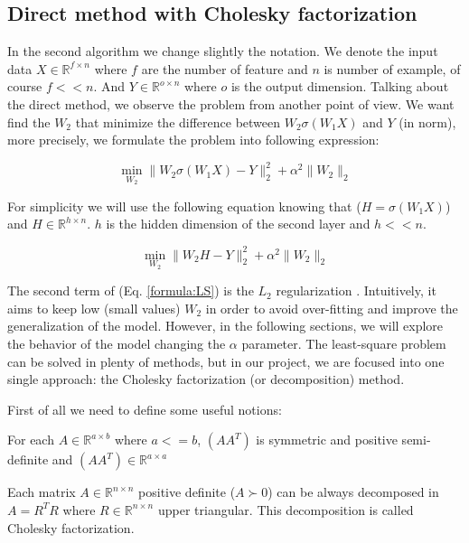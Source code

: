\subsection{Direct method with Cholesky factorization}
In the second algorithm we change slightly the notation. We denote the input data $X \in \mathbb{R}^{f \times n}$ where $f$ are the number of feature and $n$ is number of example, of course $f << n$. And $Y \in \mathbb{R}^{o \times n}$ where $o$ is the output dimension. Talking about the direct method, we observe the problem from another point of view. We want find the $W_2$ that minimize the difference between $W_2\sigma(W_1X)$ and $Y$ (in norm), more precisely, we formulate the problem into following expression:

\begin{equation}
\label{formula:LS}
\min_{W_2} \|W_2\sigma(W_1X) - Y\|_2^2  + \alpha^2\|W_2\|_2
\end{equation}

For simplicity we will use the following equation knowing that ($H = \sigma(W_1X)$) and $H \in \mathbb{R}^{h \times n}$. $h$ is the hidden dimension of the second layer and $h << n$.

\begin{equation}
\label{formula:LS}
\min_{W_2} \|W_2H- Y\|_2^2  + \alpha^2\|W_2\|_2
\end{equation}


The second term of (Eq. \ref{formula:LS}) is the $L_2$ regularization \cite{ridge_reg}. Intuitively, it aims to keep low (small values) $W_2$ in order to avoid over-fitting and improve the generalization of the model. However, in the following sections, we will explore the behavior of the model changing the $\alpha$ parameter. The least-square problem can be solved in plenty of methods, but in our project, we are focused into one single approach: the Cholesky factorization (or decomposition) method.

First of all we need to define some useful notions:
\begin{definition}
    \label{def:a_trasposea}
    For each $A \in \mathbb{R}^{ a \times b}$ where $a <= b$, $(AA^T)$ is symmetric and positive semi-definite and $(AA^T) \in \mathbb{R}^{ a \times a}$
\end{definition}
\begin{theorem}
    \label{th:th_choleksy}
    Each matrix $A \in \mathbb{R}^{ n \times n}$ positive definite ($A \succ 0$) can be always decomposed in $ A = R^TR$ where $R \in \mathbb{R}^{n \times n}$ upper triangular. This decomposition is called Cholesky factorization.
\end{theorem} 


